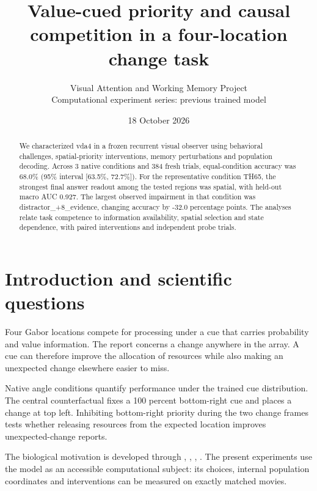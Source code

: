 \documentclass[11pt]{article}
\begin{document}
\title{\color{ink}Value-cued priority and causal competition in a four-location change task}
\author{Visual Attention and Working Memory Project\\Computational experiment series: previous trained model}\date{18 October 2026}\maketitle
\begin{abstract}
We characterized vda4 in a frozen recurrent visual observer using behavioral challenges, spatial-priority interventions, memory perturbations and population decoding. Across 3 native conditions and 384 fresh trials, equal-condition accuracy was 68.0\% (95\% interval [63.5\%, 72.7\%]). For the representative condition TH65, the strongest final answer readout among the tested regions was spatial, with held-out macro AUC 0.927. The largest observed impairment in that condition was distractor\_\allowbreak{}+8\_\allowbreak{}evidence, changing accuracy by -32.0 percentage points. The analyses relate task competence to information availability, spatial selection and state dependence, with paired interventions and independent probe trials.
\end{abstract}
\section{Introduction and scientific questions}
Four Gabor locations compete for processing under a cue that carries probability and value information. The report concerns a change anywhere in the array. A cue can therefore improve the allocation of resources while also making an unexpected change elsewhere easier to miss.

Native angle conditions quantify performance under the trained cue distribution. The central counterfactual fixes a 100 percent bottom-right cue and places a change at top left. Inhibiting bottom-right priority during the two change frames tests whether releasing resources from the expected location improves unexpected-change reports.

The biological motivation is developed through \cite{rvit}, \cite{sc}, \cite{normalization}, \cite{wolfe}. The present experiments use the model as an accessible computational subject: its choices, internal population coordinates and interventions can be measured on exactly matched movies.
\end{document}
